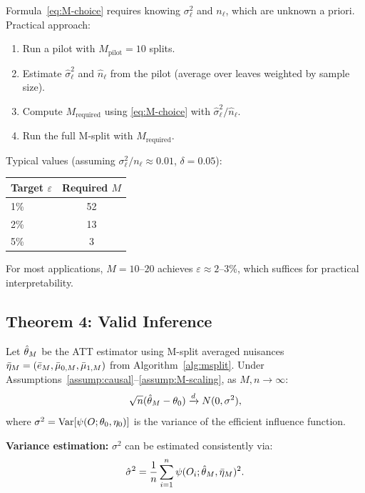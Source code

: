 \documentclass[12pt]{article}
\newcommand{\convd}{\xrightarrow{d}}
\begin{document}
\begin{remark}
Formula~\eqref{eq:M-choice} requires knowing $\sigma^2_\ell$ and $n_\ell$, which are unknown a priori. Practical approach:
\begin{enumerate}
\item Run a pilot with $M_{\text{pilot}} = 10$ splits.
\item Estimate $\hat\sigma^2_\ell$ and $\hat{n}_\ell$ from the pilot (average over leaves weighted by sample size).
\item Compute $M_{\text{required}}$ using \eqref{eq:M-choice} with $\hat\sigma^2_\ell / \hat{n}_\ell$.
\item Run the full M-split with $M_{\text{required}}$.
\end{enumerate}

Typical values (assuming $\sigma^2_\ell / n_\ell \approx 0.01$, $\delta = 0.05$):

\begin{center}
\begin{tabular}{lc}
\toprule
Target $\varepsilon$ & Required $M$ \\
\midrule
1\% & 52 \\
2\% & 13 \\
5\% & 3 \\
\bottomrule
\end{tabular}
\end{center}

For most applications, $M = 10$--$20$ achieves $\varepsilon \approx 2$--3\%, which suffices for practical interpretability.
\end{remark}

\subsection{Theorem 4: Valid Inference}

\begin{theorem}
\label{thm:inference}
Let $\hat{\theta}_M$ be the ATT estimator using M-split averaged nuisances $\bar{\eta}_M = (\bar{e}_M, \bar{\mu}_{0,M}, \bar{\mu}_{1,M})$ from Algorithm~\ref{alg:msplit}. Under Assumptions~\ref{assump:causal}--\ref{assump:M-scaling}, as $M, n \to \infty$:
\[
\sqrt{n}(\thetahat_M - \theta_0) \convd N(0, \sigma^2),
\]
where $\sigma^2 = \operatorname{Var}[\psi(O; \theta_0, \eta_0)]$ is the variance of the efficient influence function.

\textbf{Variance estimation:} $\sigma^2$ can be estimated consistently via:
\[
\hat\sigma^2 = \frac{1}{n} \sum_{i=1}^n \psi(O_i; \hat{\theta}_M, \bar{\eta}_M)^2.
\]
\end{theorem}
\end{document}
